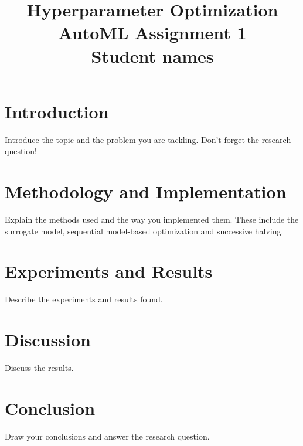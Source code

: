 \documentclass[12pt]{article}
\title{Hyperparameter Optimization \\ \large AutoML Assignment 1 \\ \small Student names}
\date{}
\author{}
\begin{document}
\maketitle

\vspace{-2.8cm}


\section{Introduction}
Introduce the topic and the problem you are tackling. Don't forget the research question!

\section{Methodology and Implementation}
Explain the methods used and the way you implemented them. These include the surrogate model, sequential model-based optimization and successive halving.

\section{Experiments and Results}
Describe the experiments and results found.

\section{Discussion}
Discuss the results.

\section{Conclusion}
Draw your conclusions and answer the research question.



\end{document}
